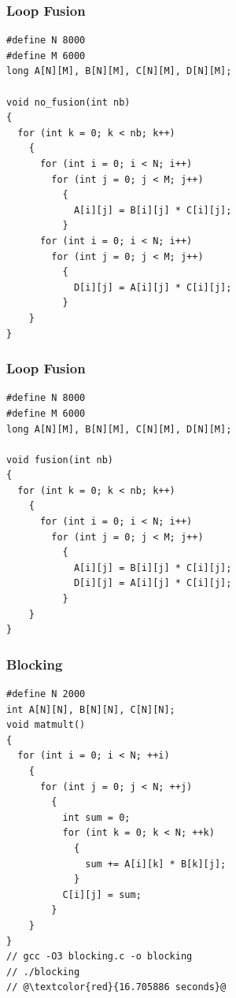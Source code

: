 \documentclass{beamer}
\begin{document}
\begin{frame}[fragile]
\frametitle{Loop Fusion}

\scriptsize

\begin{lstlisting}[linebackgroundcolor={\lstcolorlines{9,10,11,12,13,14,15,16,17,18}}]
#define N 8000
#define M 6000
long A[N][M], B[N][M], C[N][M], D[N][M];

void no_fusion(int nb)
{
  for (int k = 0; k < nb; k++)
    {
      for (int i = 0; i < N; i++)
        for (int j = 0; j < M; j++)
          {
            A[i][j] = B[i][j] * C[i][j];
          }
      for (int i = 0; i < N; i++)
        for (int j = 0; j < M; j++)
          {
            D[i][j] = A[i][j] * C[i][j];
          }
    }
}
\end{lstlisting}

\end{frame}

\begin{frame}[fragile]
\frametitle{Loop Fusion}

\scriptsize

\begin{lstlisting}[linebackgroundcolor={\lstcolorlines{9,10,11,12,13,14}}]
#define N 8000
#define M 6000
long A[N][M], B[N][M], C[N][M], D[N][M];

void fusion(int nb)
{
  for (int k = 0; k < nb; k++)
    {
      for (int i = 0; i < N; i++)
        for (int j = 0; j < M; j++)
          {
            A[i][j] = B[i][j] * C[i][j];
            D[i][j] = A[i][j] * C[i][j];
          }
    }
}
\end{lstlisting}

\end{frame}

\begin{frame}[fragile]
\frametitle{Blocking}
\scriptsize

\begin{lstlisting}
#define N 2000
int A[N][N], B[N][N], C[N][N];
void matmult()
{
  for (int i = 0; i < N; ++i)
    {
      for (int j = 0; j < N; ++j)
        {
          int sum = 0;
          for (int k = 0; k < N; ++k)
            {
              sum += A[i][k] * B[k][j];
            }
          C[i][j] = sum;
        }
    }
}
// gcc -O3 blocking.c -o blocking
// ./blocking
// @\textcolor{red}{16.705886 seconds}@
\end{lstlisting}

\end{frame}
\end{document}

